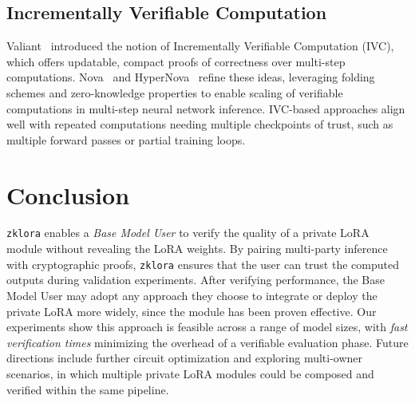 \documentclass[11pt]{article}
\begin{document}
\subsection{Incrementally Verifiable Computation}
Valiant~\cite{valiant2008incrementally} introduced the notion of Incrementally Verifiable Computation (IVC), which offers updatable, compact proofs of correctness over multi-step computations. Nova~\cite{kothapalli2022nova} and HyperNova~\cite{kothapalli2024hypernova} refine these ideas, leveraging folding schemes and zero-knowledge properties to enable scaling of verifiable computations in multi-step neural network inference. IVC-based approaches align well with repeated computations needing multiple checkpoints of trust, such as multiple forward passes or partial training loops.

\section{Conclusion}
\texttt{zklora} enables a \emph{Base Model User} to verify the quality of a private LoRA module without revealing the LoRA weights. By pairing multi-party inference with cryptographic proofs, \texttt{zklora} ensures that the user can trust the computed outputs during validation experiments. After verifying performance, the Base Model User may adopt any approach they choose to integrate or deploy the private LoRA more widely, since the module has been proven effective. Our experiments show this approach is feasible across a range of model sizes, with \emph{fast verification times} minimizing the overhead of a verifiable evaluation phase. Future directions include further circuit optimization and exploring multi-owner scenarios, in which multiple private LoRA modules could be composed and verified within the same pipeline.



\end{document}
